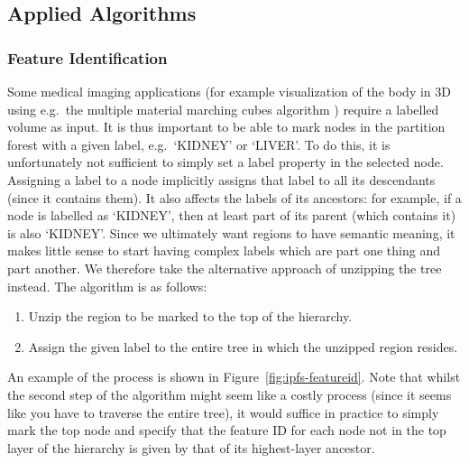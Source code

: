 \subsection{Applied Algorithms}


\subsubsection{Feature Identification}

Some medical imaging applications (for example visualization of the body in 3D using e.g.~the multiple material marching cubes algorithm \cite{wu03}) require a labelled volume as input. It is thus important to be able to mark nodes in the partition forest with a given label, e.g.~`KIDNEY' or `LIVER'. To do this, it is unfortunately not sufficient to simply set a label property in the selected node. Assigning a label to a node implicitly assigns that label to all its descendants (since it contains them). It also affects the labels of its ancestors: for example, if a node is labelled as `KIDNEY', then at least part of its parent (which contains it) is also `KIDNEY'. Since we ultimately want regions to have semantic meaning, it makes little sense to start having complex labels which are part one thing and part another. We therefore take the alternative approach of unzipping the tree instead. The algorithm is as follows:

\begin{enumerate}

\item Unzip the region to be marked to the top of the hierarchy.
\item Assign the given label to the entire tree in which the unzipped region resides.

\end{enumerate}

An example of the process is shown in Figure~\ref{fig:ipfs-featureid}. Note that whilst the second step of the algorithm might seem like a costly process (since it seems like you have to traverse the entire tree), it would suffice in practice to simply mark the top node and specify that the feature ID for each node not in the top layer of the hierarchy is given by that of its highest-layer ancestor.

